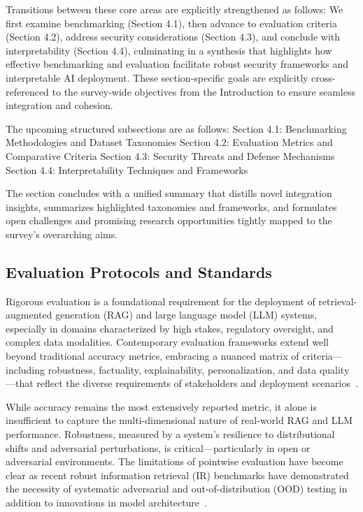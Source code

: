 \documentclass[sigconf]{acmart}
\begin{document}
Transitions between these core areas are explicitly strengthened as follows: We first examine benchmarking (Section 4.1), then advance to evaluation criteria (Section 4.2), address security considerations (Section 4.3), and conclude with interpretability (Section 4.4), culminating in a synthesis that highlights how effective benchmarking and evaluation facilitate robust security frameworks and interpretable AI deployment. These section-specific goals are explicitly cross-referenced to the survey-wide objectives from the Introduction to ensure seamless integration and cohesion.

The upcoming structured subsections are as follows:
Section 4.1: Benchmarking Methodologies and Dataset Taxonomies
Section 4.2: Evaluation Metrics and Comparative Criteria
Section 4.3: Security Threats and Defense Mechanisms
Section 4.4: Interpretability Techniques and Frameworks

The section concludes with a unified summary that distills novel integration insights, summarizes highlighted taxonomies and frameworks, and formulates open challenges and promising research opportunities tightly mapped to the survey’s overarching aims.

\subsection{Evaluation Protocols and Standards}

Rigorous evaluation is a foundational requirement for the deployment of retrieval-augmented generation (RAG) and large language model (LLM) systems, especially in domains characterized by high stakes, regulatory oversight, and complex data modalities. Contemporary evaluation frameworks extend well beyond traditional accuracy metrics, embracing a nuanced matrix of criteria—including robustness, factuality, explainability, personalization, and data quality—that reflect the diverse requirements of stakeholders and deployment scenarios~\cite{ref2,ref3,ref5,ref8,ref10,ref21,ref22,ref25,ref26,ref28,ref29,ref30,ref32,ref33,ref34,ref36,ref37,ref38,ref39,ref40,ref42,ref43,ref46,ref47,ref49,ref50,ref51,ref52,ref53,ref54,ref55,ref61,ref62}.

While accuracy remains the most extensively reported metric, it alone is insufficient to capture the multi-dimensional nature of real-world RAG and LLM performance. Robustness, measured by a system’s resilience to distributional shifts and adversarial perturbations, is critical—particularly in open or adversarial environments. The limitations of pointwise evaluation have become clear as recent robust information retrieval (IR) benchmarks have demonstrated the necessity of systematic adversarial and out-of-distribution (OOD) testing in addition to innovations in model architecture~\cite{ref49,ref50,ref54,ref61}. 
\end{document}
